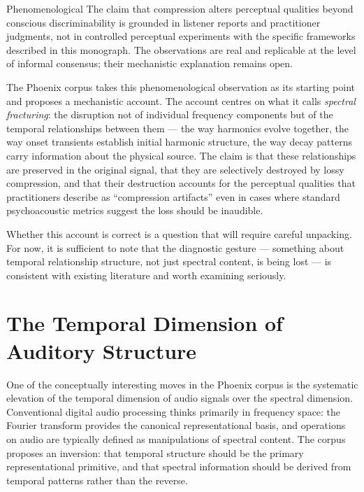 \begin{epistemicstatus}{Phenomenological}
The claim that compression alters perceptual qualities beyond
conscious discriminability is grounded in listener reports and
practitioner judgments, not in controlled perceptual experiments
with the specific frameworks described in this monograph. The
observations are real and replicable at the level of informal
consensus; their mechanistic explanation remains open.
\end{epistemicstatus}

The Phoenix corpus takes this phenomenological observation as its
starting point and proposes a mechanistic account. The account
centres on what it calls \emph{spectral fracturing}: the disruption
not of individual frequency components but of the temporal
relationships between them --- the way harmonics evolve together,
the way onset transients establish initial harmonic structure, the
way decay patterns carry information about the physical source. The
claim is that these relationships are preserved in the original
signal, that they are selectively destroyed by lossy compression,
and that their destruction accounts for the perceptual qualities
that practitioners describe as \enquote{compression artifacts} even
in cases where standard psychoacoustic metrics suggest the loss
should be inaudible.

Whether this account is correct is a question that will require
careful unpacking. For now, it is sufficient to note that the
diagnostic gesture --- something about temporal relationship
structure, not just spectral content, is being lost --- is
consistent with existing literature and worth examining seriously.

\section{The Temporal Dimension of Auditory Structure}
\label{sec:temporal-dimension}

One of the conceptually interesting moves in the Phoenix corpus is
the systematic elevation of the temporal dimension of audio signals
over the spectral dimension. Conventional digital audio processing
thinks primarily in frequency space: the Fourier transform provides
the canonical representational basis, and operations on audio are
typically defined as manipulations of spectral content. The corpus
proposes an inversion: that temporal structure should be the primary
representational primitive, and that spectral information should be
derived from temporal patterns rather than the reverse.

